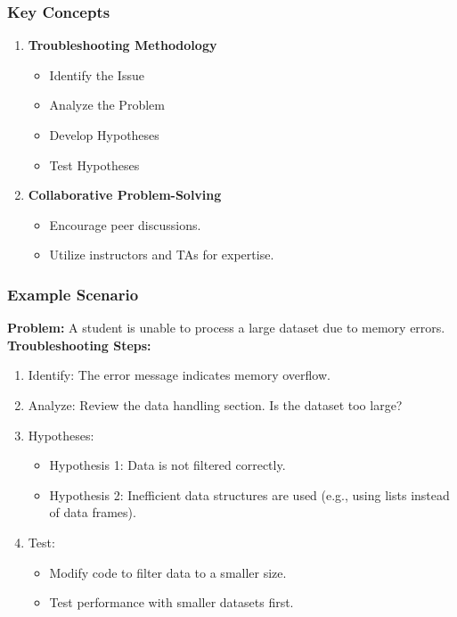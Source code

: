 \documentclass[aspectratio=169]{beamer}
\begin{document}
\begin{frame}[fragile]
    \frametitle{Key Concepts}
    \begin{enumerate}
        \item \textbf{Troubleshooting Methodology}
        \begin{itemize}
            \item Identify the Issue
            \item Analyze the Problem
            \item Develop Hypotheses
            \item Test Hypotheses
        \end{itemize}
        
        \item \textbf{Collaborative Problem-Solving}
        \begin{itemize}
            \item Encourage peer discussions.
            \item Utilize instructors and TAs for expertise.
        \end{itemize}
    \end{enumerate}
\end{frame}

\begin{frame}[fragile]
    \frametitle{Example Scenario}
    \textbf{Problem:} A student is unable to process a large dataset due to memory errors.\\
    \textbf{Troubleshooting Steps:}
    \begin{enumerate}
        \item Identify: The error message indicates memory overflow.
        \item Analyze: Review the data handling section. Is the dataset too large?
        \item Hypotheses: 
            \begin{itemize}
                \item Hypothesis 1: Data is not filtered correctly.
                \item Hypothesis 2: Inefficient data structures are used (e.g., using lists instead of data frames).
            \end{itemize}
        \item Test: 
            \begin{itemize}
                \item Modify code to filter data to a smaller size.
                \item Test performance with smaller datasets first.
            \end{itemize}
    \end{enumerate}
\end{frame}
\end{document}
